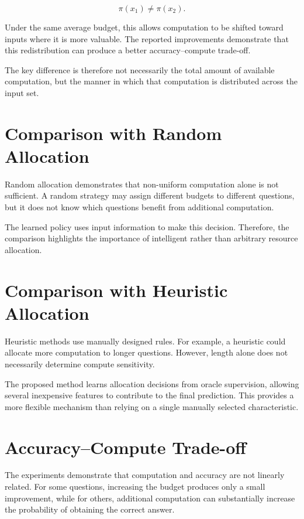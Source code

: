 \documentclass[12pt,a4paper,titlepage]{report}
\begin{document}
\begin{equation}
\pi(x_1)\neq\pi(x_2).
\end{equation}

Under the same average budget, this allows computation to be shifted toward inputs where it is more valuable. The reported improvements demonstrate that this redistribution can produce a better accuracy--compute trade-off.

The key difference is therefore not necessarily the total amount of available computation, but the manner in which that computation is distributed across the input set.

\section{Comparison with Random Allocation}

Random allocation demonstrates that non-uniform computation alone is not sufficient. A random strategy may assign different budgets to different questions, but it does not know which questions benefit from additional computation.

The learned policy uses input information to make this decision. Therefore, the comparison highlights the importance of intelligent rather than arbitrary resource allocation.

\section{Comparison with Heuristic Allocation}

Heuristic methods use manually designed rules. For example, a heuristic could allocate more computation to longer questions. However, length alone does not necessarily determine compute sensitivity.

The proposed method learns allocation decisions from oracle supervision, allowing several inexpensive features to contribute to the final prediction. This provides a more flexible mechanism than relying on a single manually selected characteristic.

\section{Accuracy--Compute Trade-off}

The experiments demonstrate that computation and accuracy are not linearly related. For some questions, increasing the budget produces only a small improvement, while for others, additional computation can substantially increase the probability of obtaining the correct answer.
\end{document}
